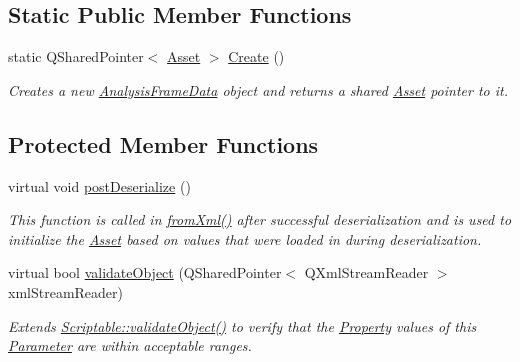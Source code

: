 \subsection*{Static Public Member Functions}
\begin{DoxyCompactItemize}
\item 
\hypertarget{class_picto_1_1_analysis_frame_data_a783d508fcb9b19f1e7dfd8d9f8182fdd}{static Q\-Shared\-Pointer$<$ \hyperlink{class_picto_1_1_asset}{Asset} $>$ \hyperlink{class_picto_1_1_analysis_frame_data_a783d508fcb9b19f1e7dfd8d9f8182fdd}{Create} ()}\label{class_picto_1_1_analysis_frame_data_a783d508fcb9b19f1e7dfd8d9f8182fdd}

\begin{DoxyCompactList}\small\item\em Creates a new \hyperlink{class_picto_1_1_analysis_frame_data}{Analysis\-Frame\-Data} object and returns a shared \hyperlink{class_picto_1_1_asset}{Asset} pointer to it. \end{DoxyCompactList}\end{DoxyCompactItemize}
\subsection*{Protected Member Functions}
\begin{DoxyCompactItemize}
\item 
virtual void \hyperlink{class_picto_1_1_analysis_frame_data_affa393fdbe9a1cd847f3d66a8fc9fc9e}{post\-Deserialize} ()
\begin{DoxyCompactList}\small\item\em This function is called in \hyperlink{class_picto_1_1_asset_a8bed4da09ecb1c07ce0dab313a9aba67}{from\-Xml()} after successful deserialization and is used to initialize the \hyperlink{class_picto_1_1_asset}{Asset} based on values that were loaded in during deserialization. \end{DoxyCompactList}\item 
virtual bool \hyperlink{class_picto_1_1_analysis_frame_data_a935dac68ae9c34e8faddcfabff4ff4be}{validate\-Object} (Q\-Shared\-Pointer$<$ Q\-Xml\-Stream\-Reader $>$ xml\-Stream\-Reader)
\begin{DoxyCompactList}\small\item\em Extends \hyperlink{class_picto_1_1_scriptable_ab6e2944c43a3b5d418bf7b251594386d}{Scriptable\-::validate\-Object()} to verify that the \hyperlink{class_picto_1_1_property}{Property} values of this \hyperlink{class_picto_1_1_parameter}{Parameter} are within acceptable ranges. \end{DoxyCompactList}\end{DoxyCompactItemize}

